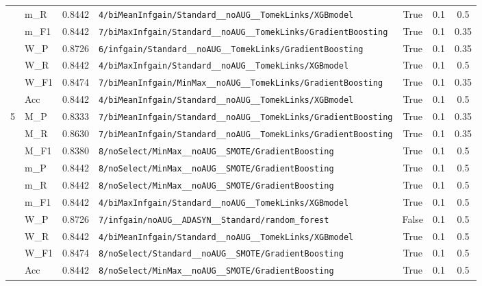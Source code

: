 \begin{table}[htbp]
\begin{tabular}{|c|l|c|>{\ttfamily\footnotesize}p{7.2cm}|c|c|c|}
 & m\_R & 0.8442 & \texttt{4/biMeanInfgain/Standard\_\_noAUG\_\_TomekLinks/XGBmodel} & True & 0.1 & 0.5 \\
 & m\_F1 & 0.8442 & \texttt{7/biMaxInfgain/Standard\_\_noAUG\_\_TomekLinks/GradientBoosting} & True & 0.1 & 0.35 \\
 & W\_P & 0.8726 & \texttt{6/infgain/Standard\_\_noAUG\_\_TomekLinks/GradientBoosting} & True & 0.1 & 0.35 \\
 & W\_R & 0.8442 & \texttt{4/biMaxInfgain/Standard\_\_noAUG\_\_TomekLinks/XGBmodel} & True & 0.1 & 0.5 \\
 & W\_F1 & 0.8474 & \texttt{7/biMeanInfgain/MinMax\_\_noAUG\_\_TomekLinks/GradientBoosting} & True & 0.1 & 0.35 \\
 & Acc & 0.8442 & \texttt{4/biMeanInfgain/Standard\_\_noAUG\_\_TomekLinks/XGBmodel} & True & 0.1 & 0.5 \\
\hline
\multirow{10}{*}{5} & M\_P & 0.8333 & \texttt{7/biMeanInfgain/Standard\_\_noAUG\_\_TomekLinks/GradientBoosting} & True & 0.1 & 0.35 \\
 & M\_R & 0.8630 & \texttt{7/biMeanInfgain/Standard\_\_noAUG\_\_TomekLinks/GradientBoosting} & True & 0.1 & 0.35 \\
 & M\_F1 & 0.8380 & \texttt{8/noSelect/MinMax\_\_noAUG\_\_SMOTE/GradientBoosting} & True & 0.1 & 0.5 \\
 & m\_P & 0.8442 & \texttt{8/noSelect/MinMax\_\_noAUG\_\_SMOTE/GradientBoosting} & True & 0.1 & 0.5 \\
 & m\_R & 0.8442 & \texttt{8/noSelect/MinMax\_\_noAUG\_\_SMOTE/GradientBoosting} & True & 0.1 & 0.5 \\
 & m\_F1 & 0.8442 & \texttt{4/biMaxInfgain/Standard\_\_noAUG\_\_TomekLinks/XGBmodel} & True & 0.1 & 0.5 \\
 & W\_P & 0.8726 & \texttt{7/infgain/noAUG\_\_ADASYN\_\_Standard/random\_forest} & False & 0.1 & 0.5 \\
 & W\_R & 0.8442 & \texttt{4/biMeanInfgain/Standard\_\_noAUG\_\_TomekLinks/XGBmodel} & True & 0.1 & 0.5 \\
 & W\_F1 & 0.8474 & \texttt{8/noSelect/Standard\_\_noAUG\_\_SMOTE/GradientBoosting} & True & 0.1 & 0.5 \\
 & Acc & 0.8442 & \texttt{8/noSelect/MinMax\_\_noAUG\_\_SMOTE/GradientBoosting} & True & 0.1 & 0.5 \\
\hline
\end{tabular}
\end{table}
